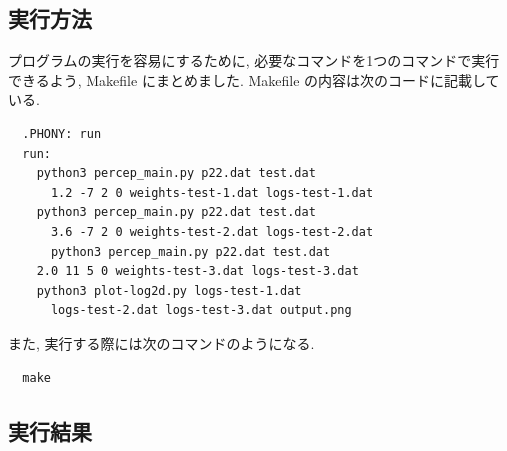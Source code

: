 \documentclass[a4j, 12pt]{jarticle}
\begin{document}
\subsection{実行方法}
プログラムの実行を容易にするために, 必要なコマンドを1つのコマンドで実行できるよう, Makefile にまとめました. Makefile の内容は次のコードに記載している. 
\begin{verbatim}
  .PHONY: run
  run:
    python3 percep_main.py p22.dat test.dat
      1.2 -7 2 0 weights-test-1.dat logs-test-1.dat
    python3 percep_main.py p22.dat test.dat
      3.6 -7 2 0 weights-test-2.dat logs-test-2.dat
      python3 percep_main.py p22.dat test.dat
    2.0 11 5 0 weights-test-3.dat logs-test-3.dat
    python3 plot-log2d.py logs-test-1.dat 
      logs-test-2.dat logs-test-3.dat output.png
\end{verbatim}
また, 実行する際には次のコマンドのようになる. 
\begin{verbatim}
  make
\end{verbatim}

\subsection{実行結果}
\end{document}
